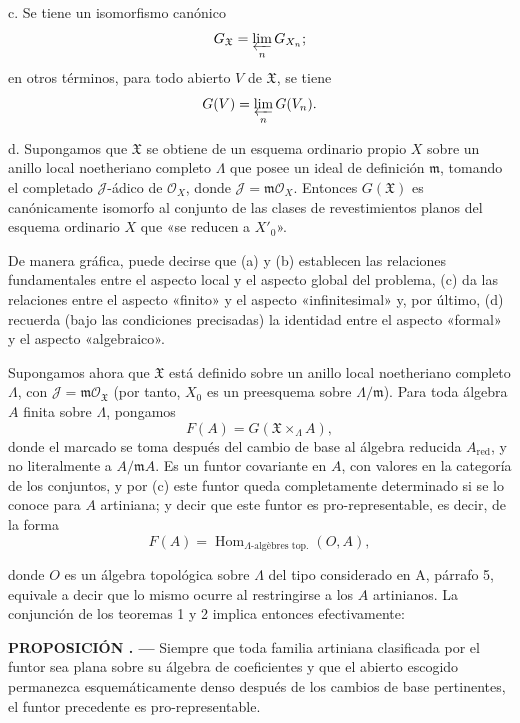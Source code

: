 \documentclass[11pt,twoside,openany]{book}
\numberwithin{equation}{section}
\newcommand{\src}[1]{%
  \phantomsection\hypertarget{src:#1}{}%
  \marginpar{\raggedleft\footnotesize\sffamily #1}%
}
\theoremstyle{plain}
\theoremstyle{definition}
\theoremstyle{remark}
\newcommand{\result}[2]{%
  \par\medskip\noindent\textbf{#1%
  \if\relax\detokenize{#2}\relax\else\space#2\fi. ---}\enspace
}
\newcommand{\FgaUnitKey}{frontmatter}
\renewcommand{\src}[1]{%
  \phantomsection\hypertarget{src:\FgaUnitKey:#1}{}%
  \marginpar{\raggedleft\footnotesize\sffamily #1}%
}
\theoremstyle{plain}
\theoremstyle{definition}
\theoremstyle{remark}
\begin{document}
\noindent c. Se tiene un isomorfismo canónico
\[
  G_{\mathfrak X}=\varprojlim_nG_{X_n} ;
\]
en otros términos, para todo abierto $V$ de $\mathfrak X$, se tiene
\[
  G(V)=\varprojlim_nG(V_n).
\]

\noindent d. Supongamos que $\mathfrak X$ se obtiene de un esquema ordinario
propio $X$ sobre un anillo local noetheriano completo $\Lambda$ que posee un
ideal de definición $\mathfrak m$, tomando el completado $\mathcal J$-ádico de
$\mathcal O_X$, donde $\mathcal J=\mathfrak m\mathcal O_X$. Entonces
$G(\mathfrak X)$ es canónicamente isomorfo al conjunto de las clases de
revestimientos planos del esquema ordinario $X$ que «se reducen a $X'_0$».

De manera gráfica, puede decirse que (a) y (b) establecen las relaciones
fundamentales entre el aspecto local y el aspecto global del problema, (c) da
las relaciones entre el aspecto «finito» y el aspecto «infinitesimal» y, por
último, (d) recuerda (bajo las condiciones precisadas) la identidad entre el
aspecto «formal» y el aspecto «algebraico».

Supongamos ahora que $\mathfrak X$ está definido sobre un anillo local
noetheriano completo $\Lambda$, con
$\mathcal J=\mathfrak m\mathcal O_{\mathfrak X}$ (por tanto, $X_0$ es un
preesquema sobre $\Lambda/\mathfrak m$). Para toda álgebra $A$ finita sobre
$\Lambda$, pongamos
\[
  F(A)=G(\mathfrak X\times_\Lambda A),
\]
donde el marcado se toma después del cambio de base al álgebra reducida $A_{\mathrm{red}}$, y no literalmente a $A/\mathfrak mA$. Es un funtor covariante en $A$, con valores en la categoría de los conjuntos,
y por (c) este funtor queda completamente determinado si se lo conoce para $A$
artiniana; y decir que este funtor es pro-representable, es decir, de la forma
\[
  F(A)=\operatorname{Hom}_{\Lambda\text{-algèbres top.}}(O,A),
\]

\src{389}
donde $O$ es un álgebra topológica sobre $\Lambda$ del tipo considerado en A,
párrafo 5, equivale a decir que lo mismo ocurre al restringirse a los $A$
artinianos. La conjunción de los teoremas 1 y 2 implica entonces efectivamente:

\result{PROPOSICIÓN}{5.1} Siempre que toda familia artiniana clasificada por el funtor sea plana sobre su álgebra de coeficientes y que el abierto escogido permanezca esquemáticamente denso después de los cambios de base pertinentes, el funtor precedente es pro-representable.
\end{document}
